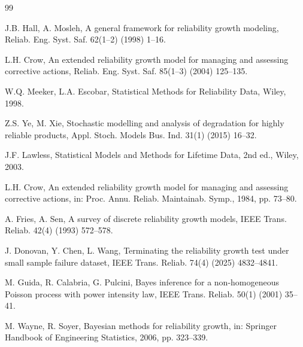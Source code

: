 \documentclass[a4paper,fleqn,longmktitle]{cas-sc}
\begin{document}
\begin{thebibliography}{99}

J.B. Hall, A. Mosleh, A general framework for reliability growth modeling, Reliab. Eng. Syst. Saf. 62(1--2) (1998) 1--16.





L.H. Crow, An extended reliability growth model for managing and assessing corrective actions, Reliab. Eng. Syst. Saf. 85(1--3) (2004) 125--135.





W.Q. Meeker, L.A. Escobar, Statistical Methods for Reliability Data, Wiley, 1998.





Z.S. Ye, M. Xie, Stochastic modelling and analysis of degradation for highly reliable products, Appl. Stoch. Models Bus. Ind. 31(1) (2015) 16--32.





J.F. Lawless, Statistical Models and Methods for Lifetime Data, 2nd ed., Wiley, 2003.





L.H. Crow, An extended reliability growth model for managing and assessing corrective actions, in: Proc. Annu. Reliab. Maintainab. Symp., 1984, pp. 73--80.





A. Fries, A. Sen, A survey of discrete reliability growth models, IEEE Trans. Reliab. 42(4) (1993) 572--578.





J. Donovan, Y. Chen, L. Wang, Terminating the reliability growth test under small sample failure dataset, IEEE Trans. Reliab. 74(4) (2025) 4832--4841.





M. Guida, R. Calabria, G. Pulcini, Bayes inference for a non-homogeneous Poisson process with power intensity law, IEEE Trans. Reliab. 50(1) (2001) 35--41.





M. Wayne, R. Soyer, Bayesian methods for reliability growth, in: Springer Handbook of Engineering Statistics, 2006, pp. 323--339.






\end{thebibliography}
\end{document}
